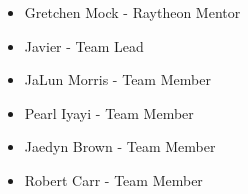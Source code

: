 
\begin{itemize}
  \item Gretchen Mock - Raytheon Mentor
  \item Javier - Team Lead
  \item JaLun Morris - Team Member
  \item Pearl Iyayi - Team Member
  \item Jaedyn Brown - Team Member
  \item Robert Carr - Team Member
\end{itemize}
